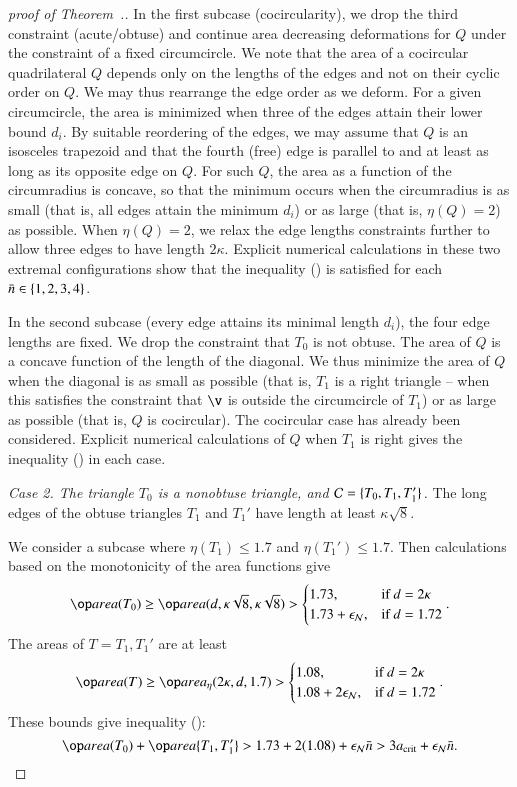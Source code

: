 \begin{proof}[proof of Theorem~.]
In the first subcase (cocircularity), we drop the third constraint
(acute/obtuse) and continue area decreasing deformations for $Q$
under the constraint of a fixed circumcircle.  We note that the area
of a cocircular quadrilateral $Q$ depends only on the lengths of the
edges and not on their cyclic order on $Q$.  We may thus rearrange the
edge order as we deform.  For a given circumcircle, the area is
minimized when three of the edges attain their lower bound $d_i$.  By
suitable reordering of the edges, we may assume that $Q$ is an
isosceles trapezoid and that the fourth (free) edge is parallel to and
at least as long as its opposite edge on $Q$.  For such $Q$, the area as a
function of the circumradius is concave, so that the minimum occurs
when the circumradius is as small (that is, all edges attain the
minimum $d_i$) or as large (that is, $\eta(Q)=2$) as possible.  When
$\eta(Q)=2$, we relax the edge lengths constraints further to allow
three edges to have length $2\kappa$.  Explicit numerical calculations
in these two extremal configurations show that the inequality
() is satisfied for each $\bar n\in \{1,2,3,4\}$.

In the second subcase (every edge attains its minimal length $d_i$),
the four edge lengths are fixed.  We drop the constraint that $T_0$ is
not obtuse. The area of $Q$ is a concave function of the length of the
diagonal.  We thus minimize the area of $Q$ when the diagonal is as
small as possible (that is, $T_1$ is a right triangle -- when this
satisfies the constraint that $\v$ is outside the circumcircle of
$T_1$) or as large as possible (that is, $Q$ is cocircular).  The
cocircular case has already been considered.  Explicit numerical
calculations of $Q$ when $T_1$ is right gives the inequality
() in each case.

{\it Case 2. The triangle $T_0$ is a nonobtuse triangle, and
  $\mathcal C=\{T_0,T_1,T_1'\}$.}  
The long edges of the obtuse triangles
$T_1$ and $T_1'$ have length at least $\kappa\sqrt{8}$.

We consider a subcase where $\eta(T_1)\le 1.7$ and $\eta(T_1') \le
1.7$.  Then calculations based on the monotonicity of the area
functions give
\[
\area(T_0) \ge \area(d,\kappa\sqrt{8},\kappa\sqrt{8}) > 
   \begin{cases}1.73,&\text{if } d= 2\kappa\\ 
     1.73+\epsN, & \text{if } d = 1.72 \end{cases}.
\]
The areas of $T=T_1,T_1'$ are at least
\begin{equation}\libel{eqn:173}
\area(T) \ge \areta(2\kappa,d,1.7) >
   \begin{cases}1.08,&\text{if } d = 2\kappa\\
     1.08+2\epsN, & \text{if } d = 1.72 \end{cases}.
\end{equation}
These bounds give inequality ():
\[
\area(T_0) +\area\{T_1,T_1'\}  > 1.73 + 2(1.08) + \epsN \tn > 
3 \acrit +  \epsN \tn.
\]


\end{proof}
